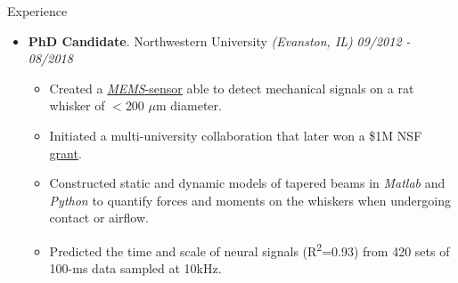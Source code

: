 \documentclass{resume} %
\begin{document}
\begin{rSection}{Experience}
\begin{itemize}[leftmargin=0em]
			\item {\bf PhD Candidate}{. Northwestern University \textit{(Evanston, IL)}} \hfill {\em 09/2012 - 08/2018}\\
			\vspace{-5mm}
			\begin{itemize}
				\setlength\itemsep{-1.75em}
				\item Created a \href{https://www.youtube.com/watch?v=EPuThXPd-qw}{\textit{MEMS}-sensor} able to detect mechanical signals on a rat whisker of $<$200 $\mu$m diameter.\\
				\item Initiated a multi-university collaboration that later won a \$1M NSF \href{https://www.nsf.gov/news/mmg/mmg_disp.jsp?med_id=132588}{grant}.\\
				\item Constructed static and dynamic models of tapered beams in \textit{Matlab} and \textit{Python} to quantify forces and moments on the whiskers when undergoing contact or airflow.\\
				\item Predicted the time and scale of neural signals (R\textsuperscript{2}=0.93) from 420 sets of 100-ms data sampled at 10kHz.\\
			\end{itemize}
			
			
		\end{itemize}
		
	\end{rSection}
	
	
	
\end{document}
